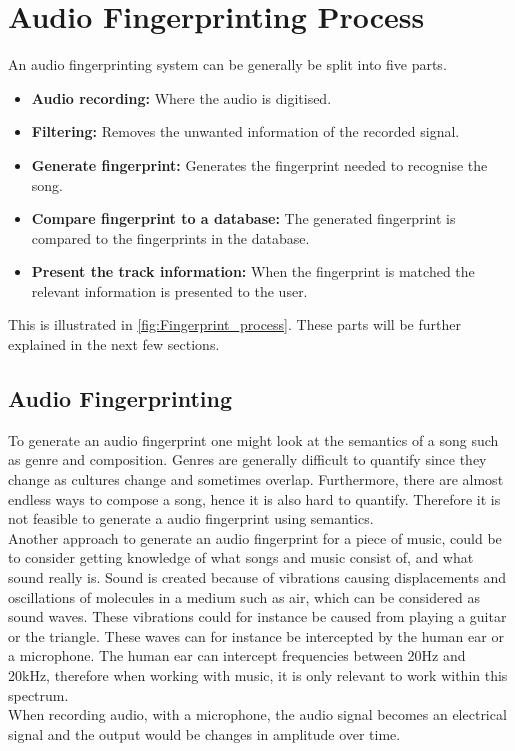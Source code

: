 \section{Audio Fingerprinting Process}
An audio fingerprinting system can be generally be split into five parts.
\begin{itemize}
    \item \textbf{Audio recording:} Where the audio is digitised.
    \item \textbf{Filtering:} Removes the unwanted information of the recorded signal.
    \item \textbf{Generate fingerprint:} Generates the fingerprint needed to recognise the song.
    \item \textbf{Compare fingerprint to a database:} The generated fingerprint is compared to the fingerprints in the database.
    \item \textbf{Present the track information:} When the fingerprint is matched the relevant information is presented to the user.
\end{itemize}
This is illustrated in \autoref{fig:Fingerprint_process}.
These parts will be further explained in the next few sections.
   


\subsection{Audio Fingerprinting}
To generate an audio fingerprint one might look at the semantics of a song such as genre and composition. Genres are generally difficult to quantify since they change as cultures change and sometimes overlap. Furthermore, there are almost endless ways to compose a song, hence it is also hard to quantify. Therefore it is not feasible to generate a audio fingerprint using semantics.\\

Another approach to generate an audio fingerprint for a piece of music, could be to consider getting knowledge of what songs and music consist of, and what sound really is.
Sound is created because of vibrations causing displacements and oscillations of molecules in a medium such as air, which can be considered as sound waves. These vibrations could for instance be caused from playing a guitar or the triangle. These waves can for instance be intercepted by the human ear or a microphone. The human ear can intercept frequencies between 20Hz and 20kHz, therefore when working with music, it is only relevant to work within this spectrum. \cite[21]{Meinard2015Fundamentals}\\
When recording audio, with a microphone, the audio signal becomes an electrical signal and the output would be changes in amplitude over time.

